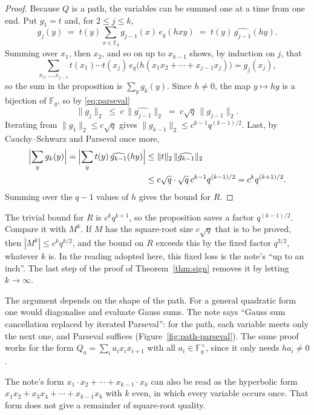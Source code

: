 \documentclass[11pt]{amsbook}
\theoremstyle{plain}
\theoremstyle{definition}
\theoremstyle{remark}
\numberwithin{equation}{section}
\numberwithin{figure}{chapter}
\numberwithin{table}{chapter}
\newcommand{\F}{\mathbb{F}}
\begin{document}
\begin{proof}
Because $Q$ is a path, the variables can be summed one at a time
from one end. Put $g_1 = t$ and, for $2 \le j \le k$,
\[
  g_j(y) \;=\; t(y)\sum_{x\in\F_q} g_{j-1}(x)\,e_q(hxy)
  \;=\; t(y)\,\widehat{g_{j-1}}(hy).
\]
Summing over $x_1$, then $x_2$, and so on up to $x_{k-1}$ shows, by
induction on $j$, that
\[
  \sum_{x_1,\dots,x_{j-1}} t(x_1)\cdots t(x_j)\,
  e_q\bigl(h(x_1x_2+\cdots+x_{j-1}x_j)\bigr) = g_j(x_j),
\]
so the sum in the proposition is $\sum_{y} g_k(y)$. Since
$h \ne 0$, the map $y \mapsto hy$ is a bijection of $\F_q$, so by
\eqref{eq:parseval}
\[
  \|g_j\|_2 \;\le\; c\,\|\widehat{g_{j-1}}\|_2
  \;=\; c\sqrt q\,\|g_{j-1}\|_2 .
\]
Iterating from $\|g_1\|_2 \le c\sqrt q$ gives
$\|g_{k-1}\|_2 \le c^{k-1} q^{(k-1)/2}$. Last, by Cauchy--Schwarz
and Parseval once more,
\begin{align*}
  \Bigl|\sum_y g_k(y)\Bigr|
  =\Bigl|\sum_y t(y)\,\widehat{g_{k-1}}(hy)\Bigr|
  &\le \|t\|_2\,\|\widehat{g_{k-1}}\|_2\\
  &\le c\sqrt q\cdot \sqrt q\, c^{k-1} q^{(k-1)/2}
  = c^k q^{(k+1)/2}.
\end{align*}
Summing over the $q - 1$ values of $h$ gives the bound for $R$.
\end{proof}

The trivial bound for $R$ is $c^kq^{k+1}$, so the proposition saves
a factor $q^{(k-1)/2}$. Compare it with $M^k$.
If $M$ has the square-root size $c\sqrt q$ that is to be proved,
then $|M^k|\le c^kq^{k/2}$, and the bound on $R$ exceeds this by the
fixed factor $q^{3/2}$, whatever $k$ is. In the reading adopted
here, this fixed loss is the note's ``up to an inch''. The last step
of the proof of Theorem~\ref{thm:sign} removes it by letting
$k \to \infty$.

The argument depends on the shape of the path. For a general
quadratic form one would diagonalise and evaluate Gauss sums. The
note says ``Gauss sum cancellation replaced by iterated Parseval'':
for the path, each variable meets only the next one, and Parseval suffices (Figure~\ref{fig:path-parseval}). The
same proof works for the form
$Q_a=\sum_ia_ix_ix_{i+1}$ with all $a_i\in\F_q^\times$, since it
only needs $ha_i\ne0$.

The note's form $x_1 \cdot x_2 + \cdots + x_{k-1}\cdot x_k$ can
also be read as the hyperbolic form
$x_1x_2+x_3x_4+\cdots+x_{k-1}x_k$ with $k$ even, in which every
variable occurs once. That form does not give a remainder of
square-root quality.
\begin{figure}[tbp]
\centering

\end{figure}
\end{document}
